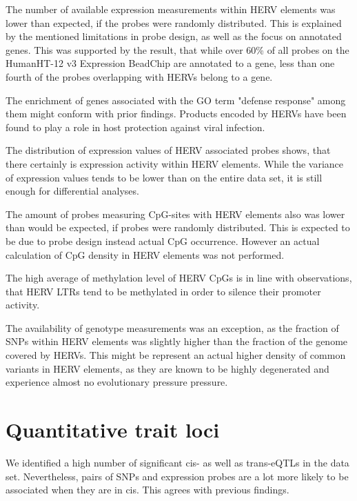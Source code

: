 \documentclass[a4paper,12pt,twoside,openright]{report}
\begin{document}
The number of available expression measurements within HERV elements was lower than expected, if the probes were randomly distributed. This is explained by the mentioned limitations in probe design, as well as the focus on annotated genes. This was supported by the result, that while over 60\% of all probes on the HumanHT-12 v3 Expression BeadChip are annotated to a gene, less than one fourth of the probes overlapping with HERVs belong to a gene.

The enrichment of genes associated with the GO term "defense response" among them might conform with prior findings. Products encoded by HERVs have been found to play a role in host protection against viral infection\cite{Malfavon-Borja2015}.

The distribution of expression values of HERV associated probes shows, that there certainly is expression activity within HERV elements. While the variance of expression values tends to be lower than on the entire data set, it is still enough for differential analyses. 

The amount of probes measuring CpG-sites with HERV elements also was lower than would be expected, if probes were randomly distributed. This is expected to be due to probe design instead actual CpG occurrence. However an actual calculation of CpG density in HERV elements was not performed. 

The high average of methylation level of HERV CpGs is in line with observations, that HERV LTRs tend to be methylated in order to silence their promoter activity\cite{Smith2013}.

The availability of genotype measurements was an exception, as the fraction of SNPs within HERV elements was slightly higher than the fraction of the genome covered by HERVs. This might be represent an actual higher density of common variants in HERV elements, as they are known to be highly degenerated and experience almost no evolutionary pressure pressure\cite{10.1146/annurev.genom.7.080505.115700}.

\section{Quantitative trait loci}
\label{Discussion:Quantitative trait loci}
We identified a high number of significant cis- as well as trans-eQTLs in the data set. Nevertheless, pairs of SNPs and expression probes are a lot more likely to be associated when they are in cis. This agrees with previous findings\cite{}.
\end{document}
